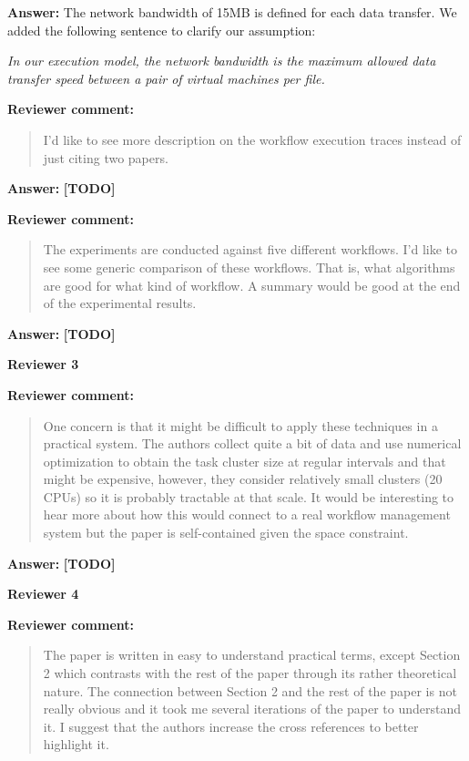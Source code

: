 \documentclass{letter}
\newenvironment{review}%
{\textbf{Reviewer comment:}\begin{quote}}%
{\end{quote}}%
\newcommand{\todo}[1]{%
      \color{red}\textbf{[TODO]} #1\color{black}}
\newcommand{\answer}[1]{%
      \textbf{Answer:} #1}
\newcommand{\revised}[1]{\emph{#1}\color{black}}
\begin{document}
\begin{letter}{}
\answer{The network bandwidth of 15MB is defined for each data transfer. We added the following sentence to clarify our assumption:}

\revised{In our execution model, the network bandwidth is the maximum allowed data transfer speed between a pair of virtual machines per file.}



\begin{review}
I'd like to see more description on the workflow execution traces instead of just citing two papers.
\end{review}

\answer{\todo{}}



\begin{review}
The experiments are conducted against five different workflows. I'd like to see some generic comparison of these workflows. That is, what algorithms are good for what kind of workflow. A summary would be good at the end of the experimental results.
\end{review}

\answer{\todo{}}



\newpage

%
%
\textbf{Reviewer 3}

\begin{review}
One concern is that it might be difficult to apply these techniques in a practical system.  The authors collect quite a bit of data and use numerical optimization to obtain the task cluster size at regular intervals and that might be expensive, however, they consider relatively small clusters (20 CPUs) so it is probably tractable at that scale.  It would be interesting to hear more about how this would connect to a real workflow management system but the paper is self-contained given the space constraint. 
\end{review}

\answer{\todo{}}



\newpage

%
%
\textbf{Reviewer 4}

\begin{review}
The paper is written in easy to understand practical terms, except Section 2 which contrasts with the rest of the paper through its rather theoretical nature. The connection between Section 2 and the rest of the paper is not really obvious and it took me several iterations of the paper to understand it. I suggest that the authors increase the cross references to better highlight it. 
\end{review}


\end{letter}
\end{document}
